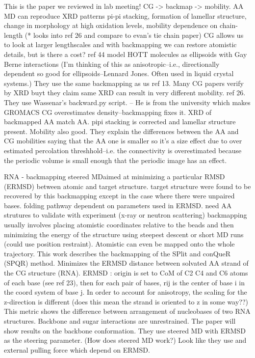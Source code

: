 \documentclass{article}
\begin{document}
This is the paper we reviewed in lab meeting! CG -> backmap -> mobility. AA MD can reproduce XRD patterns pi-pi stacking, formation of lamellar structure, change in morphology at high oxidation levels, mobility dependence on chain-length (* looks into ref 26 and compare to evan's tie chain paper)
CG allows us to look at larger lengthscales and with backmapping we can restore atomistic details, but is there a cost? ref 44 model HOTT molecules as ellipsoids with Gay Berne interactions (I'm thinking of this as anisotropic--i.e., directionally dependent so good for ellipsoids--Lennard Jones. Often used in liquid crystal systems.) 
They use the same backmapping as us ref 13. Many CG papers verify by XRD buyt they claim same XRD can result in very different mobility. ref 26. They use Wassenar's backward.py script. -- He is from the university which makes GROMACS
CG overestimates density--backmapping fixes it. XRD of backmapped AA match AA. pipi stacking is corrected and lamellar structure present. Mobility also good. They explain the differences between the AA and CG mobilities saying that the AA one is smaller so it's a size effect due to over estimated percolation threshhold--i.e. the connectivity is overestimated because the periodic volume is small enough that the periodic image has an effect.

\cite{Poblete2018a}

RNA - backmapping steered MDaimed at minimizing a particular RMSD (ERMSD) between atomic and target structure. target structure were found to be recovered by this backmapping except in the case where there were unpaired bases. folding pathway dependent on parameters used in ERMSD.
need AA strutures to validate with experiment (x-ray or neutron scattering) backmapping usually involves placing atomistic coordinates relative to the beads and then minimizing the energy of the structure using steepest descent or short MD runs (could use position restraint). Atomistic can even be mapped onto the whole trajectory. 
This work describes the backmapping of the SPlit and conQueR (SPQR) method. Minimizes the ERMSD distance between solvated AA strand of the CG structure (RNA). ERMSD : origin is set to CoM of C2 C4 and C6 atoms of each base (see ref 23), then for each pair of bases, rij is the center of base i in the coord system of base j. In order to account for anisotropy, the scaling for the z-direction is different (does this mean the strand is oriented to z in some way??) This metric shows the difference between arrangement of nucleobases of two RNA structures. Backbone and sugar interactions are unrestrained. The paper will show results on the backbone conformation. They use steered MD with ERMSD as the steering parameter. (How does steered MD work?) Look like they use and external pulling force which depend on ERMSD.
\end{document}
